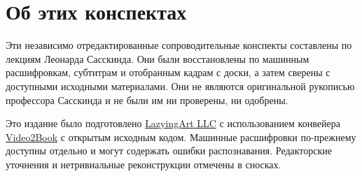\documentclass[11pt,oneside]{book}
\begin{document}
\frontmatter
\hypersetup{pageanchor=false}

\hypersetup{pageanchor=true}

\clearpage
\chapter*{Об этих конспектах}
Эти независимо отредактированные сопроводительные конспекты составлены по лекциям Леонарда Сасскинда. Они были восстановлены по машинным расшифровкам, субтитрам и отобранным кадрам с доски, а затем сверены с доступными исходными материалами. Они не являются оригинальной рукописью профессора Сасскинда и не были им ни проверены, ни одобрены.

Это издание было подготовлено \href{https://lazying.art}{LazyingArt LLC} с использованием конвейера \href{https://github.com/lachlanchen/Video2Book}{Video2Book} с открытым исходным кодом. Машинные расшифровки по-прежнему доступны отдельно и могут содержать ошибки распознавания. Редакторские уточнения и нетривиальные реконструкции отмечены в сносках.
\clearpage
\tableofcontents
\mainmatter










\end{document}
